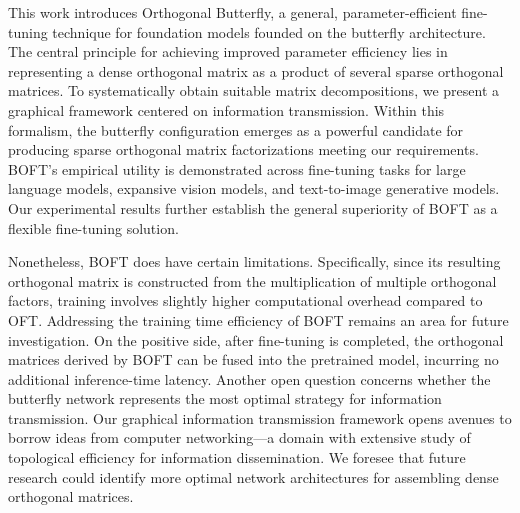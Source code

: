 This work introduces Orthogonal Butterfly, a general, parameter-efficient fine-tuning technique for foundation models founded on the butterfly architecture. The central principle for achieving improved parameter efficiency lies in representing a dense orthogonal matrix as a product of several sparse orthogonal matrices. To systematically obtain suitable matrix decompositions, we present a graphical framework centered on information transmission. Within this formalism, the butterfly configuration emerges as a powerful candidate for producing sparse orthogonal matrix factorizations meeting our requirements. BOFT’s empirical utility is demonstrated across fine-tuning tasks for large language models, expansive vision models, and text-to-image generative models. Our experimental results further establish the general superiority of BOFT as a flexible fine-tuning solution.

Nonetheless, BOFT does have certain limitations. Specifically, since its resulting orthogonal matrix is constructed from the multiplication of multiple orthogonal factors, training involves slightly higher computational overhead compared to OFT. Addressing the training time efficiency of BOFT remains an area for future investigation. On the positive side, after fine-tuning is completed, the orthogonal matrices derived by BOFT can be fused into the pretrained model, incurring no additional inference-time latency. Another open question concerns whether the butterfly network represents the most optimal strategy for information transmission. Our graphical information transmission framework opens avenues to borrow ideas from computer networking—a domain with extensive study of topological efficiency for information dissemination. We foresee that future research could identify more optimal network architectures for assembling dense orthogonal matrices.

